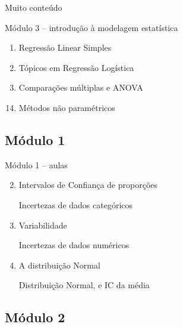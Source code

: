 \documentclass{beamer}
\begin{document}
\begin{frame}{\scriptsize Muito conteúdo}
\begin{block}{\scriptsize Módulo 3 -- introdução à modelagem estatística}
\begin{enumerate}
    \item Regressão Linear Simples

    \item Tópicos em Regressão Logística

    \item Comparações múltiplas e ANOVA

    \end{enumerate}
  \end{block}
  \begin{enumerate}
    \setcounter{enumi}{13}
    \tiny
  \item Métodos não paramétricos

  \end{enumerate}
\end{frame}

\subsection{Módulo 1}

\begin{frame}{\scriptsize Módulo 1 -- aulas}
  \begin{enumerate}
    \setcounter{enumi}{1}
  \item Intervalos de Confiança de proporções

    {\tiny Incertezas de dados categóricos}
    \bigskip
  \item Variabilidade

    {\tiny Incertezas de dados numéricos}
    \bigskip
  \item A distribuição Normal

    {\tiny Distribuição Normal, e IC da média}
  \end{enumerate}
\end{frame}

\subsection{Módulo 2}
\end{document}
